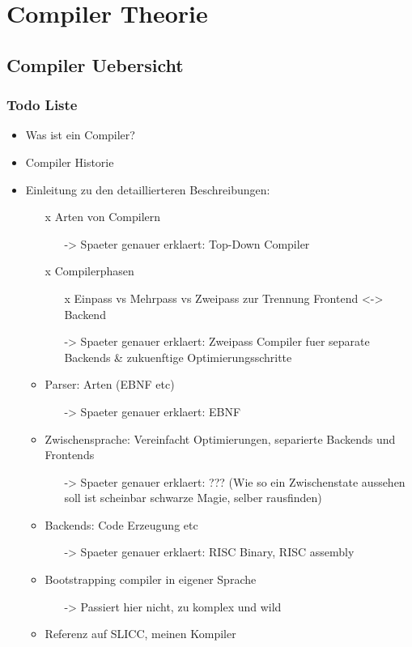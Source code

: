 \part{Compiler Theorie}
\chapter{Compiler Uebersicht}
\label{chap:theory:compilerHistory}

\section{Todo Liste}

\begin{itemize}
  \item Was ist ein Compiler?
  \item Compiler Historie
  \item Einleitung zu den detaillierteren Beschreibungen:
  \begin{itemize}
    \item [x] Arten von Compilern 
    \begin{itemize}
    \item[->] Spaeter genauer erklaert: Top-Down Compiler
    \end{itemize}
  \item [x] Compilerphasen
    \begin{itemize}
      \item [x] Einpass vs Mehrpass vs Zweipass zur Trennung Frontend <-> Backend
      \item[->] Spaeter genauer erklaert: Zweipass Compiler fuer separate Backends \& zukuenftige Optimierungsschritte
    \end{itemize}
    \item Parser: Arten (EBNF etc)
    \begin{itemize}
    \item[->] Spaeter genauer erklaert: EBNF
    \end{itemize}
    \item Zwischensprache: Vereinfacht Optimierungen, separierte Backends und Frontends
    \begin{itemize}
      \item[->] Spaeter genauer erklaert: ??? (Wie so ein Zwischenstate aussehen soll ist scheinbar schwarze Magie, selber rausfinden)
    \end{itemize}
    \item Backends: Code Erzeugung etc
    \begin{itemize}
      \item[->] Spaeter genauer erklaert: RISC Binary, RISC assembly
    \end{itemize}
    \item Bootstrapping compiler in eigener Sprache
    \begin{itemize}
      \item[->] Passiert hier nicht, zu komplex und wild
    \end{itemize}
    \item Referenz auf SLICC, meinen Kompiler
  \end{itemize}
\end{itemize}


